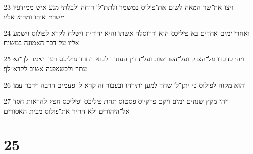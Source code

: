 \par 23 ויצו את־שר המאה לשום את־פולוס במשמר ולתת־לו רוחה ולבלתי מנע איש ממידעיו משרת אותו ומבוא אליו׃
\par 24 ואחרי ימים אחדים בא פיליכס הוא ודרוסלה אשתו והיא יהודית וישלח לקרא לפולוס וישמע אליו על־דבר האמונה במשיח׃
\par 25 ויהי כדברו על־הצדק ועל־הפרישות ועל־הדין העתיד לבוא ויחרד פיליכס ויען ויאמר לך־נא עתה ולכשאפנה אשוב לקרא־לך׃
\par 26 והוא מקוה לפולוס כי יתן־לו שחד למען יתירהו ובעבור זה קרא לו פעמים הרבה וידבר עמו׃
\par 27 ויהי מקץ שנתים ימים ויקם פרקיוס פסטוס תחת פיליכס ופיליכס חפץ להראות חסד אל־היהודים ולא התיר את־פולוס מבית האסורים׃

\chapter{25}

